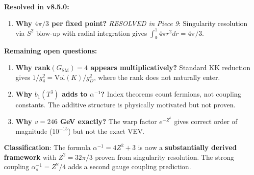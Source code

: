 \documentclass[12pt,a4paper]{article}
\newcommand{\Zsq}{Z^2}
\begin{document}
\begin{tcolorbox}[colback=yellow!10!white, colframe=orange!75!black, title=Derivation Gaps (v8.5.0 Update)]
\textbf{Resolved in v8.5.0:}
\begin{enumerate}[itemsep=0pt]
    \item[\checkmark] \textbf{Why $4\pi/3$ per fixed point?} \textit{RESOLVED in Piece 9}: Singularity resolution via $S^2$ blow-up with radial integration gives $\int_0^1 4\pi r^2 dr = 4\pi/3$.
\end{enumerate}

\textbf{Remaining open questions:}
\begin{enumerate}[itemsep=0pt]
    \item \textbf{Why rank$(G_{\text{SM}}) = 4$ appears multiplicatively?} Standard KK reduction gives $1/g_4^2 = \text{Vol}(K)/g_D^2$, where the rank does not naturally enter.
    \item \textbf{Why $b_1(T^3)$ adds to $\alpha^{-1}$?} Index theorems count fermions, not coupling constants. The additive structure is physically motivated but not proven.
    \item \textbf{Why $v = 246$ GeV exactly?} The warp factor $e^{-\Zsq}$ gives correct order of magnitude ($10^{-15}$) but not the exact VEV.
\end{enumerate}

\textbf{Classification}: The formula $\alpha^{-1} = 4\Zsq + 3$ is now a \textbf{substantially derived framework} with $\Zsq = 32\pi/3$ proven from singularity resolution. The strong coupling $\alpha_s^{-1} = \Zsq/4$ adds a second gauge coupling prediction.
\end{tcolorbox}
\end{document}
